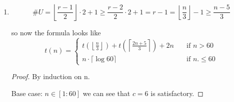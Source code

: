 \documentclass{article}
\begin{document}
\begin{tasks}
{\begin{enumerate}[label={(\arabic*)}]
{                    that the total comparisons needded just for sorting is \(\lfloor n/3\rfloor\cdot3\). That combined with
                    \(n-1\) gives us \(d = \frac{\lfloor n/3\rfloor\cdot3}{n} + \frac{n - 1}{n}\), \(d \to 2\) as \(n \to \infty\).
                }
                \item {
                    \begin{displaymath}
                        \#U 
                        = \left\lfloor\frac{r-1}{2}\right\rfloor\cdot2+1
                        \geq \frac{r-2}{2} \cdot 2 + 1
                        = r - 1
                        = \left\lfloor \frac{n}{3} \right\rfloor - 1
                        \geq \frac{n-5}{3}
                    \end{displaymath}

                    so now the formula looks like
                    \begin{displaymath}
                        t(n) = \begin{cases}
                            t\left(\left\lfloor\frac{n}{3}\right\rfloor\right) + t\left(\left\lceil\frac{2n+5}{3}\right\rceil\right) + 2n \quad & \text{if } n > 60 \\
                            n\cdot\lceil\log60\rceil & \text{if } n. \leq 60
                        \end{cases}
                    \end{displaymath}

                    \begin{proof}
                        By induction on n.

                        Base case: \(n \in [1:60]\) we can see that \(c = 6\) is satisfactory.
                        

\end{proof}}
\end{enumerate}}
\end{tasks}
\end{document}
